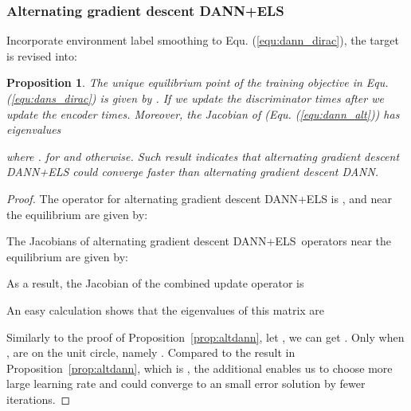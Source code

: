 \documentclass{article} \usepackage{iclr2023_conference,times}
\newtheorem{prop}{Proposition}
\newcommand{\abbr}[0]{DANN+ELS\xspace}
\newcommand{\myref}[1]{Equ. (\ref{#1})}
\begin{document}
\subsubsection{Alternating gradient descent \abbr}
Incorporate environment label smoothing to \myref{equ:dann_dirac}, the target is revised into:

\begin{prop}
The unique equilibrium point of the training objective in \myref{equ:dans_dirac} is given by . If we update the discriminator  times after we update the encoder  times. Moreover, the Jacobian of  (\myref{equ:dann_alt}) has eigenvalues

where .  for  and  otherwise. Such result indicates that alternating gradient descent \abbr could converge faster than alternating gradient descent DANN. 
\label{prop:altdans}
\end{prop}
\begin{proof}
The operator for alternating gradient descent \abbr is , and  near the equilibrium are given by:

The Jacobians of alternating gradient descent \abbr~operators  near the equilibrium are given by:

As a result, the Jacobian of the combined update operator  is
 
An easy calculation shows that the eigenvalues of this matrix are

Similarly to the proof of Proposition~\ref{prop:altdann}, let , we can get . Only when ,  are on the unit circle, namely . Compared to the result in Proposition~\ref{prop:altdann}, which is , the additional  enables us to choose more large learning rate and could converge to an small error solution by fewer iterations.
\end{proof}
\end{document}

